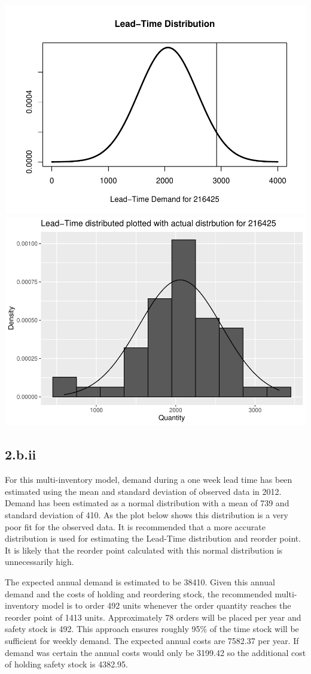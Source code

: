 \documentclass[
  11pt,
]{article}
\begin{document}
\includegraphics[width=0.5\linewidth]{Assignment-STAT702---final_files/figure-latex/2bi plots,figures-side-1}
\includegraphics[width=0.5\linewidth]{Assignment-STAT702---final_files/figure-latex/2bi plots,figures-side-2}

\hypertarget{b.ii}{%
\subsection{2.b.ii}\label{b.ii}}

For this multi-inventory model, demand during a one week lead time has
been estimated using the mean and standard deviation of observed data in
2012. Demand has been estimated as a normal distribution with a mean of
739 and standard deviation of 410. As the plot below shows this
distribution is a very poor fit for the observed data. It is recommended
that a more accurate distribution is used for estimating the Lead-Time
distribution and reorder point. It is likely that the reorder point
calculated with this normal distribution is unnecessarily high.

The expected annual demand is estimated to be 38410. Given this annual
demand and the costs of holding and reordering stock, the recommended
multi-inventory model is to order 492 units whenever the order quantity
reaches the reorder point of 1413 units. Approximately 78 orders will be
placed per year and safety stock is 492. This approach ensures roughly
95\% of the time stock will be sufficient for weekly demand. The
expected annual costs are 7582.37 per year. If demand was certain the
annual costs would only be 3199.42 so the additional cost of holding
safety stock is 4382.95.
\end{document}
